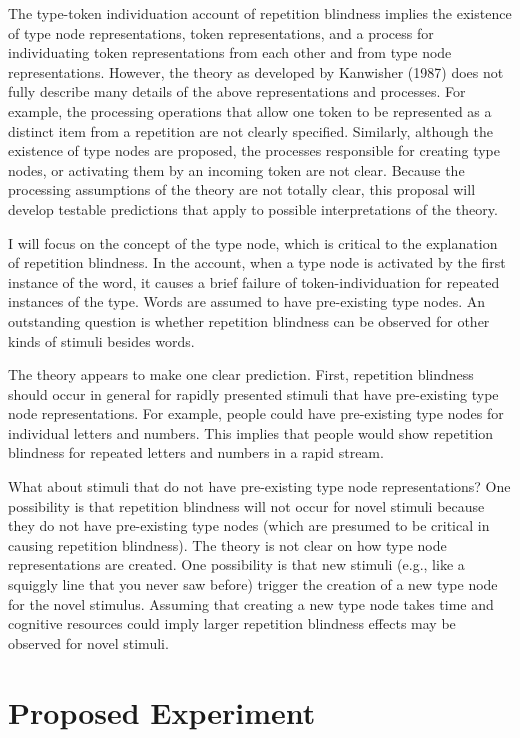 \documentclass[
  man,floatsintext]{apa6}
\begin{document}
The type-token individuation account of repetition blindness implies the existence of type node representations, token representations, and a process for individuating token representations from each other and from type node representations. However, the theory as developed by Kanwisher (1987) does not fully describe many details of the above representations and processes. For example, the processing operations that allow one token to be represented as a distinct item from a repetition are not clearly specified. Similarly, although the existence of type nodes are proposed, the processes responsible for creating type nodes, or activating them by an incoming token are not clear. Because the processing assumptions of the theory are not totally clear, this proposal will develop testable predictions that apply to possible interpretations of the theory.

I will focus on the concept of the type node, which is critical to the explanation of repetition blindness. In the account, when a type node is activated by the first instance of the word, it causes a brief failure of token-individuation for repeated instances of the type. Words are assumed to have pre-existing type nodes. An outstanding question is whether repetition blindness can be observed for other kinds of stimuli besides words.

The theory appears to make one clear prediction. First, repetition blindness should occur in general for rapidly presented stimuli that have pre-existing type node representations. For example, people could have pre-existing type nodes for individual letters and numbers. This implies that people would show repetition blindness for repeated letters and numbers in a rapid stream.

What about stimuli that do not have pre-existing type node representations? One possibility is that repetition blindness will not occur for novel stimuli because they do not have pre-existing type nodes (which are presumed to be critical in causing repetition blindness). The theory is not clear on how type node representations are created. One possibility is that new stimuli (e.g., like a squiggly line that you never saw before) trigger the creation of a new type node for the novel stimulus. Assuming that creating a new type node takes time and cognitive resources could imply larger repetition blindness effects may be observed for novel stimuli.

\hypertarget{proposed-experiment}{%
\section{Proposed Experiment}\label{proposed-experiment}}
\end{document}
